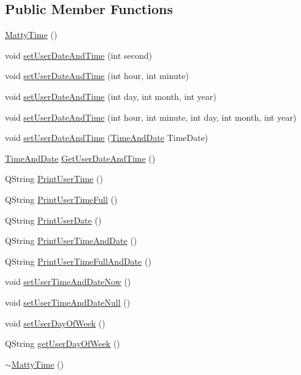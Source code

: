 \subsection*{Public Member Functions}
\begin{DoxyCompactItemize}
\item 
\hyperlink{classMattyTime_aebf245aa0b578982cad3f679ea5348cd}{Matty\+Time} ()
\item 
void \hyperlink{classMattyTime_a858357a5febc483c27f9bbf96b83b175}{set\+User\+Date\+And\+Time} (int second)
\item 
void \hyperlink{classMattyTime_a60828ca950added6776f53ca3ea047fc}{set\+User\+Date\+And\+Time} (int hour, int minute)
\item 
void \hyperlink{classMattyTime_ac6d00b726df1a8c493452dfc52332f6f}{set\+User\+Date\+And\+Time} (int day, int month, int year)
\item 
void \hyperlink{classMattyTime_a34af1776506d7a99387db16982987e1c}{set\+User\+Date\+And\+Time} (int hour, int minute, int day, int month, int year)
\item 
void \hyperlink{classMattyTime_ae470fb0341c517348ec3ea7d606f67c5}{set\+User\+Date\+And\+Time} (\hyperlink{structTimeAndDate}{Time\+And\+Date} Time\+Date)
\item 
\hyperlink{structTimeAndDate}{Time\+And\+Date} \hyperlink{classMattyTime_ac2f2f818e4c476cc11f9c13e97cacfae}{Get\+User\+Date\+And\+Time} ()
\item 
Q\+String \hyperlink{classMattyTime_a9cbf666ccbe45a8ca45f9ffc42d5102c}{Print\+User\+Time} ()
\item 
Q\+String \hyperlink{classMattyTime_a3fda0198071ebc95afe2d4405dd9c55e}{Print\+User\+Time\+Full} ()
\item 
Q\+String \hyperlink{classMattyTime_a646278576993d7ed05af67aee6ac96cb}{Print\+User\+Date} ()
\item 
Q\+String \hyperlink{classMattyTime_afa30c1dd3bae1e8f50e816803f39d1c4}{Print\+User\+Time\+And\+Date} ()
\item 
Q\+String \hyperlink{classMattyTime_a6bcaa1f4975d99ab2f9025076de5ef99}{Print\+User\+Time\+Full\+And\+Date} ()
\item 
void \hyperlink{classMattyTime_afef585f71d11eed7777065af8ca0e9f0}{set\+User\+Time\+And\+Date\+Now} ()
\item 
void \hyperlink{classMattyTime_a6ae52c957bcf12e92624e09db890ce21}{set\+User\+Time\+And\+Date\+Null} ()
\item 
void \hyperlink{classMattyTime_a12b0e0b9c4d45248da89e2d4078d4d08}{set\+User\+Day\+Of\+Week} ()
\item 
Q\+String \hyperlink{classMattyTime_ad2f12ac7d1a959ee9e19a4eac30484fd}{get\+User\+Day\+Of\+Week} ()
\item 
\hyperlink{classMattyTime_acb302c8f6c5215dc974f87753ed2fd61}{$\sim$\+Matty\+Time} ()
\end{DoxyCompactItemize}

